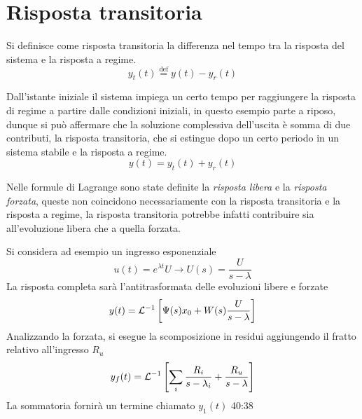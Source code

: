 \newpage
\section{Risposta transitoria}
Si definisce come risposta transitoria la differenza nel tempo tra la risposta
del sistema e la risposta a regime.
$$
y_t(t) \stackrel{\text{def}}{=} y(t) - y_r(t)
$$
\begin{figure}[h]
 \centering

\end{figure}
Dall'istante iniziale il sistema impiega un certo tempo per raggiungere la
risposta di regime a partire dalle condizioni iniziali, in questo esempio
parte a riposo, dunque si può affermare che la soluzione complessiva
dell'uscita è somma di due contributi, la risposta transitoria, che si estingue
dopo un certo periodo in un sistema stabile e la risposta a regime.
$$
y(t) = y_t(t) + y_r(t)
$$

Nelle formule di Lagrange sono state definite la \textit{risposta libera} e la
\textit{risposta forzata}, queste non coincidono necessariamente con la
risposta transitoria e la risposta a regime, la risposta transitoria potrebbe
infatti contribuire sia all'evoluzione libera che a quella forzata.

Si considera ad esempio un ingresso esponenziale
$$
u(t) = e^{\lambda t} U \longrightarrow U(s) = \frac{U}{s-\lambda}
$$
La risposta completa sarà l'antitrasformata delle evoluzioni libere e forzate
$$
y(t) = \mathcal{L}^{-1} \left[ \Psi(s)x_0 + W(s)\frac{U}{s-\lambda}  \right]
$$
Analizzando la forzata, si esegue la scomposizione in residui aggiungendo il
fratto relativo all'ingresso $R_u$
$$
y_f(t) = \mathcal{L}^{-1}\left[\sum_i \frac{R_i}{s-\lambda_i} +
\frac{R_u}{s-\lambda}\right]
$$
La sommatoria fornirà un termine chiamato $y_1(t)$
40:38
